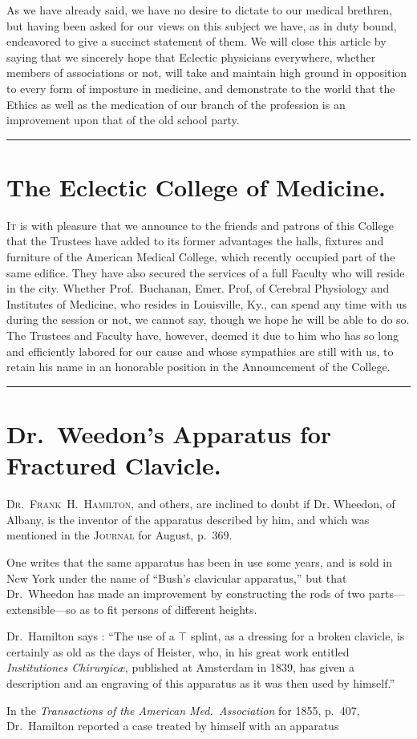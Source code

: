 
As we have already said, we have no desire to dictate to our medical
brethren, but having been asked for our views on this subject we
have, as in duty bound, endeavored to give a succinct statement of them.
We will close this article by saying that we sincerely hope that Eclectic
physicians everywhere, whether members of associations or not, will
take and maintain high ground in opposition to every form of imposture
in medicine, and demonstrate to the world that the Ethics as well
as the medication of our branch of the profession is an improvement
upon that of the old school party.

\fancybreak{*}

\section*{The Eclectic College of Medicine.}

\lettrine[lines=1]{}{It} is with pleasure that we announce to the friends and patrons of this
College that the Trustees have added to its former advantages the halls,
fixtures and furniture of the American Medical College, which recently
occupied part of the same edifice. They have also secured the services
of a full Faculty who will reside in the city. Whether Prof.~Buchanan,
Emer. Prof, of Cerebral Physiology and Institutes of Medicine, who
resides in Louisville, Ky., can spend any time with us during the session
or not, we cannot say, though we hope he will be able to do so. The
Trustees and Faculty have, however, deemed it due to him who has so
long and efficiently labored for our cause and whose sympathies are still
with us, to retain his name in an honorable position in the Announcement
of the College.

\fancybreak{*}

\section*{Dr.~Weedon's Apparatus for Fractured Clavicle.}

\lettrine[lines=1]{}{Dr.~Frank~H.\ Hamilton}, and others, are inclined to doubt if Dr.
Wheedon, of Albany, is the inventor of the apparatus described by him,
and which was mentioned in the \textsc{Journal} for August, p.\ 369.

One writes that the same apparatus has been in use some years, and
is sold in New York under the name of ``Bush's clavicular apparatus,''
but that Dr.~Wheedon has made an improvement by constructing the
rods of two parts---extensible---so as to fit persons of different heights.

Dr.~Hamilton says : ``The use of a $\top$ splint, as a dressing for a broken
clavicle, is certainly as old as the days of Heister, who, in his great work
entitled \emph{Institutiones Chirurgicæ}, published at Amsterdam in 1839, has
given a description and an engraving of this apparatus as it was then
used by himself.''

In the \emph{Transactions of the American Med.\ Association} for 1855,
p.~407, Dr.~Hamilton reported a case treated by himself with an apparatus\endinput
